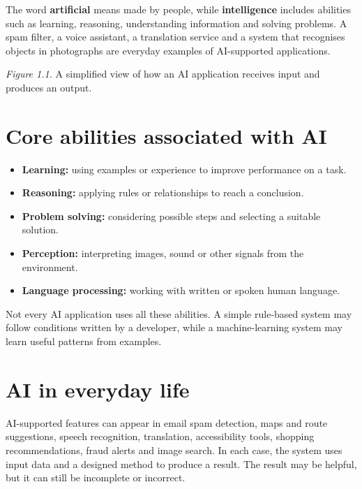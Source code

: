 \documentclass[11pt,openany,oneside]{book}
\newcommand{\keyterm}[1]{\textbf{\color{Navy}#1}}
\begin{document}
The word \keyterm{artificial} means made by people, while \keyterm{intelligence} includes abilities such as learning, reasoning, understanding information and solving problems. A spam filter, a voice assistant, a translation service and a system that recognises objects in photographs are everyday examples of AI-supported applications.

\begin{center}
\end{center}
\textit{Figure 1.1.} A simplified view of how an AI application receives input and produces an output.

\section{Core abilities associated with AI}
\begin{itemize}
\item \keyterm{Learning:} using examples or experience to improve performance on a task.
\item \keyterm{Reasoning:} applying rules or relationships to reach a conclusion.
\item \keyterm{Problem solving:} considering possible steps and selecting a suitable solution.
\item \keyterm{Perception:} interpreting images, sound or other signals from the environment.
\item \keyterm{Language processing:} working with written or spoken human language.
\end{itemize}
Not every AI application uses all these abilities. A simple rule-based system may follow conditions written by a developer, while a machine-learning system may learn useful patterns from examples.

\section{AI in everyday life}
AI-supported features can appear in email spam detection, maps and route suggestions, speech recognition, translation, accessibility tools, shopping recommendations, fraud alerts and image search. In each case, the system uses input data and a designed method to produce a result. The result may be helpful, but it can still be incomplete or incorrect.
\end{document}
